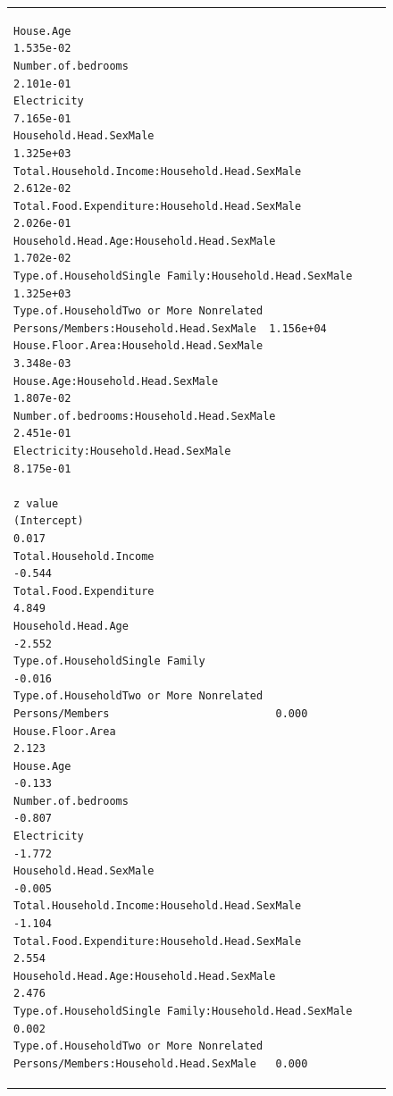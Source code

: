 \documentclass[
]{article}
\begin{document}
\begin{figure}[H]
\begin{table}[H]
\begin{tabular}[t]{lrr}
\begin{verbatim}
House.Age                                                                       1.535e-02
Number.of.bedrooms                                                              2.101e-01
Electricity                                                                     7.165e-01
Household.Head.SexMale                                                          1.325e+03
Total.Household.Income:Household.Head.SexMale                                   2.612e-02
Total.Food.Expenditure:Household.Head.SexMale                                   2.026e-01
Household.Head.Age:Household.Head.SexMale                                       1.702e-02
Type.of.HouseholdSingle Family:Household.Head.SexMale                           1.325e+03
Type.of.HouseholdTwo or More Nonrelated Persons/Members:Household.Head.SexMale  1.156e+04
House.Floor.Area:Household.Head.SexMale                                         3.348e-03
House.Age:Household.Head.SexMale                                                1.807e-02
Number.of.bedrooms:Household.Head.SexMale                                       2.451e-01
Electricity:Household.Head.SexMale                                              8.175e-01
                                                                               z value
(Intercept)                                                                      0.017
Total.Household.Income                                                          -0.544
Total.Food.Expenditure                                                           4.849
Household.Head.Age                                                              -2.552
Type.of.HouseholdSingle Family                                                  -0.016
Type.of.HouseholdTwo or More Nonrelated Persons/Members                          0.000
House.Floor.Area                                                                 2.123
House.Age                                                                       -0.133
Number.of.bedrooms                                                              -0.807
Electricity                                                                     -1.772
Household.Head.SexMale                                                          -0.005
Total.Household.Income:Household.Head.SexMale                                   -1.104
Total.Food.Expenditure:Household.Head.SexMale                                    2.554
Household.Head.Age:Household.Head.SexMale                                        2.476
Type.of.HouseholdSingle Family:Household.Head.SexMale                            0.002
Type.of.HouseholdTwo or More Nonrelated Persons/Members:Household.Head.SexMale   0.000

\end{verbatim}
\end{tabular}
\end{table}
\end{figure}
\end{document}
